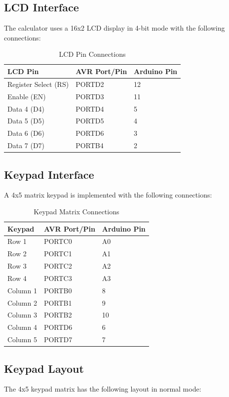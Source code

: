 \documentclass[12pt,a4paper]{article}
\begin{document}
\subsection{LCD Interface}
The calculator uses a 16x2 LCD display in 4-bit mode with the following connections:

\begin{table}[h]
\centering
\begin{tabular}{|l|l|l|}
\hline
\textbf{LCD Pin} & \textbf{AVR Port/Pin} & \textbf{Arduino Pin} \\
\hline
Register Select (RS) & PORTD2 & 12 \\
\hline
Enable (EN) & PORTD3 & 11 \\
\hline
Data 4 (D4) & PORTD4 & 5 \\
\hline
Data 5 (D5) & PORTD5 & 4 \\
\hline
Data 6 (D6) & PORTD6 & 3 \\
\hline
Data 7 (D7) & PORTB4 & 2 \\
\hline
\end{tabular}
\caption{LCD Pin Connections}
\end{table}

\subsection{Keypad Interface}
A 4x5 matrix keypad is implemented with the following connections:

\begin{table}[h]
\centering
\begin{tabular}{|l|l|l|}
\hline
\textbf{Keypad} & \textbf{AVR Port/Pin} & \textbf{Arduino Pin} \\
\hline
Row 1 & PORTC0 & A0 \\
\hline
Row 2 & PORTC1 & A1 \\
\hline
Row 3 & PORTC2 & A2 \\
\hline
Row 4 & PORTC3 & A3 \\
\hline
Column 1 & PORTB0 & 8 \\
\hline
Column 2 & PORTB1 & 9 \\
\hline
Column 3 & PORTB2 & 10 \\
\hline
Column 4 & PORTD6 & 6 \\
\hline
Column 5 & PORTD7 & 7 \\
\hline
\end{tabular}
\caption{Keypad Matrix Connections}
\end{table}

\subsection{Keypad Layout}
The 4x5 keypad matrix has the following layout in normal mode:
\end{document}
